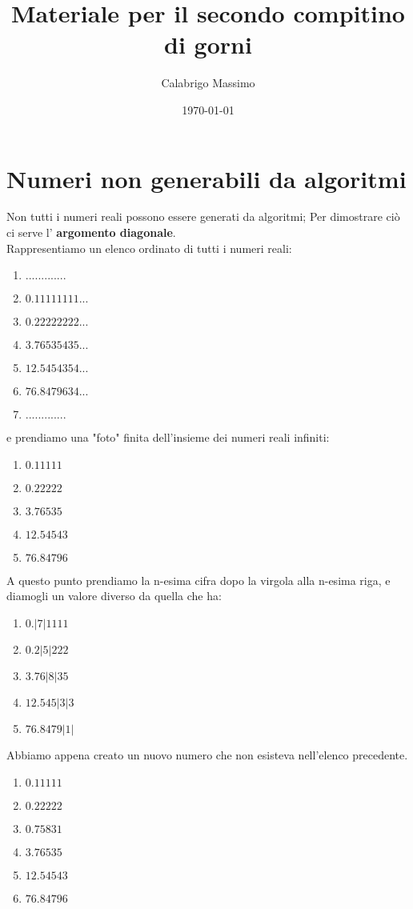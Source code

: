 \documentclass[11pt]{article}
\begin{document}
\title{Materiale per il secondo compitino di gorni}
\author{Calabrigo Massimo}
\date{\today}
\maketitle

\tableofcontents

\section{Numeri non generabili da algoritmi}
Non tutti i numeri reali possono essere generati da algoritmi; Per dimostrare ciò ci serve l' \textbf{argomento diagonale}.\\
Rappresentiamo un elenco ordinato di tutti i numeri reali:
\begin{enumerate}
    \item $.............$
    \item $0.11111111...$
    \item $0.22222222...$
    \item $3.76535435...$
    \item $12.5454354...$
    \item $76.8479634...$
    \item $.............$
\end{enumerate}
e prendiamo una "foto" finita dell'insieme dei numeri reali infiniti:
\begin{enumerate}
    \item $0.11111$
    \item $0.22222$
    \item $3.76535$
    \item $12.54543$
    \item $76.84796$
\end{enumerate}
A questo punto prendiamo la n-esima cifra dopo la virgola alla n-esima riga, e diamogli un valore diverso da quella che ha:
\begin{enumerate}
    \item $0.|7|1111$
    \item $0.2|5|222$
    \item $3.76|8|35$
    \item $12.545|3|3$
    \item $76.8479|1|$
\end{enumerate}
Abbiamo appena creato un nuovo numero che non esisteva nell'elenco precedente.
\begin{enumerate}
    \item $0.11111$
    \item $0.22222$
    \item $0.75831$
    \item $3.76535$
    \item $12.54543$
    \item $76.84796$
\end{enumerate}
\end{document}
